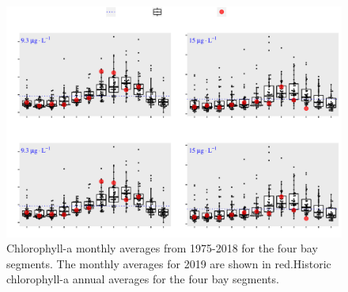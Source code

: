 \documentclass[final,t]{beamer}\usepackage[]{graphicx}\usepackage[]{color}
\begin{document}
\begin{frame}
\begin{columns}[t]
\begin{column}{.63\linewidth}
\begin{figure}
\centerline{\includegraphics[trim = 0cm 0cm 0cm 0cm, width=1\linewidth]{figure/chlboxplot.pdf}}
\caption{\footnotesize Chlorophyll-a monthly averages from 1975-2018 for the four bay segments. The monthly averages for 2019 are shown in red.Historic chlorophyll-a annual averages for the four bay segments.}
\label{fig:chlboxplot}
\end{figure}

\vspace{-0.375in}


\end{column}
\end{columns}
\end{frame}
\end{document}
